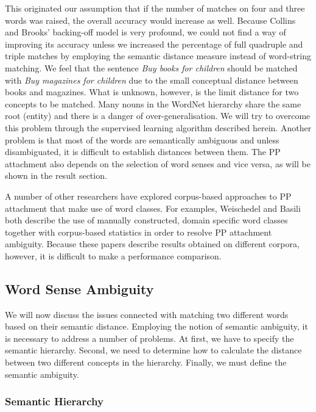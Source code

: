 This originated our assumption that if the number of matches on four and three words was raised, the overall accuracy would increase as well. Because Collins and Brooks' backing-off model is very profound, we could not find a way of improving its accuracy unless we increased the percentage of full quadruple and triple matches by employing the semantic distance measure instead of word-string matching. We feel that the sentence {\it Buy books for children} should be matched with {\it Buy magazines for children} due to the small conceptual distance between books and magazines. What is unknown, however, is the limit distance for two concepts to be matched. Many nouns in the WordNet hierarchy share the same root (entity) and there is a danger of over-generalisation. We will try to overcome this problem through the supervised learning algorithm described herein. Another problem is that most of the words are semantically ambiguous and unless disambiguated, it is difficult to establish distances between them. The PP attachment also depends on the selection of word senses and vice versa, as will be shown in the result section.

A number of other researchers have explored corpus-based approaches to PP attachment that make use of word classes. For examples, Weischedel \cite{W91} and Basili \cite{B91} both describe the use of manually constructed, domain specific word classes together with corpus-based statistics in order to resolve PP attachment ambiguity.\hspace{-0.2mm} Because these \mbox{papers} describe results obtained on different corpora, however, it is difficult to make a performance comparison.



\subsection{Word Sense Ambiguity}

We will now discuss the issues connected with matching two different words based on their semantic distance. Employing the notion of semantic ambiguity, it is necessary to address a number of problems. At first, we have to specify the semantic hierarchy. Second, we need to determine how to calculate the distance between two different concepts in the hierarchy. Finally, we must define the semantic ambiguity.

\subsubsection{Semantic Hierarchy}

